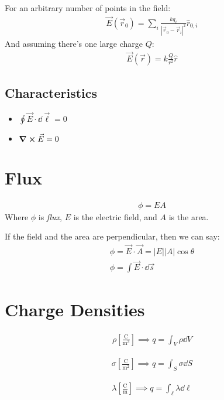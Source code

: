 \documentclass[00_complete]{subfiles}
\begin{document}
For an arbitrary number of points in the field:
\begin{gather*}
    \vec E(\vec r_0)=\sum_i\frac{kq_i}{|\vec r_0-\vec r_i|^2}\hat r_{0,i}
\end{gather*}
And assuming there's one large charge $Q$:
\begin{gather*}
    \vec E(\vec r)=k\frac{Q}{r^2}\hat r
\end{gather*}
\subsection{Characteristics}
\begin{itemize}
    \item $\oint \vec E \cdot \dd{ \vec \ell} = 0$
    \item $\curl \vec E = 0$
\end{itemize}
\section{Flux}
\begin{definition}[Flux]
\begin{gather*}
    \phi = EA
\end{gather*}
Where $\phi$ is \emph{flux}, $E$ is the electric field, and $A$ is the area.
\end{definition}
If the field and the area are perpendicular, then we can say:
\begin{gather*}
    \phi = \vec E \cdot \vec A = |E||A|\cos\theta \\
    \phi = \int \vec E \cdot \dd{\vec s}
\end{gather*}
\section{Charge Densities}
\begin{definition}
\begin{gather*}
    \rho \left[\frac{\mathrm{C}}{\mathrm{m^3}}\right] \implies q = \int_V \rho
    \dd{V}
\end{gather*}
\end{definition}
\begin{definition}
\begin{gather*}
    \sigma \left[\frac{\mathrm{C}}{\mathrm{m^2}}\right] \implies q = \int_S
    \sigma \dd{S}
\end{gather*}
\end{definition}
\begin{definition}
\begin{gather*}
    \lambda \left[\frac{\mathrm{C}}{\mathrm{m}}\right] \implies q = \int_\ell
    \lambda \dd{\ell}
\end{gather*}
\end{definition}
\end{document}
